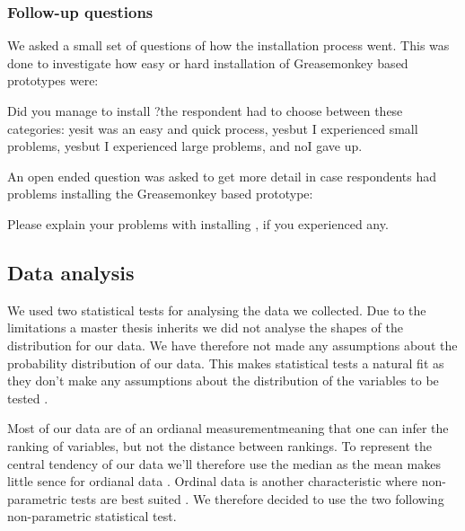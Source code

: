\subsubsection{Follow-up questions}

We asked a small set of questions of how the installation process went. This
was done to investigate how easy or hard installation of Greasemonkey based
prototypes were:

\begin{items}
  \item Did you manage to install \latest{}?\dash{}the respondent had to
  choose between these categories: yes\dash{}it was an easy and quick process,
  yes\dash{}but I experienced small problems, yes\dash{}but I experienced
  large problems, and no\dash{}I gave up.
\end{items}

An open ended question was asked to get more detail in case respondents had
problems installing the Greasemonkey based prototype:


\begin{items}
  \item Please explain your problems with installing \latest{}, if you
    experienced any.
\end{items}

\subsection{Data analysis}

We used two statistical tests for analysing the data we collected. Due to the
limitations a master thesis inherits we did not analyse the shapes of the
distribution for our data. We have therefore not made any assumptions about
the probability distribution of our data. This makes
 statistical tests a natural fit as they don't make any
assumptions about the distribution of the variables to be tested
\citep{wikipedia08nonparametric}.

Most of our data are of an ordianal measurement\dash{}meaning that one can
infer the ranking of variables, but not the distance between rankings.
To represent the central tendency of our data we'll therefore use the median
as the mean makes little sence for ordianal data
\citep{wikipedia08levelofmeasurement}.
Ordinal data is another characteristic where non-parametric tests
are best suited \citep{wikipedia08nonparametric}. We therefore decided
to use the two following non-parametric statistical test.

